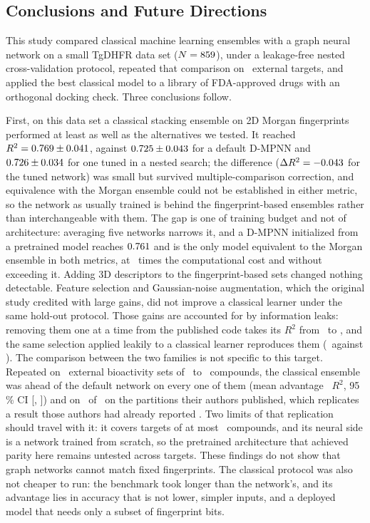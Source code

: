 \subsection{Conclusions and Future Directions}

This study compared classical machine learning ensembles with a graph neural network on a small TgDHFR data set ($N = 859$), under a leakage-free nested cross-validation protocol, repeated that comparison on \GenNTargets\ external targets, and applied the best classical model to a library of FDA-approved drugs with an orthogonal docking check. Three conclusions follow.

First, on this data set a classical stacking ensemble on 2D Morgan fingerprints performed at least as well as the alternatives we tested. It reached $R^2 = 0.769 \pm 0.041$, against $0.725 \pm 0.043$ for a default D-MPNN and $0.726 \pm 0.034$ for one tuned in a nested search; the difference ($\Delta R^2 = -0.043$ for the tuned network) was small but survived multiple-comparison correction, and equivalence with the Morgan ensemble could not be established in either metric, so the network as usually trained is behind the fingerprint-based ensembles rather than interchangeable with them. The gap is one of training budget and not of architecture: averaging five networks narrows it, and a D-MPNN initialized from a pretrained model reaches $0.761$ and is the only model equivalent to the Morgan ensemble in both metrics, at \ChemeleonCostFactor\ times the computational cost and without exceeding it. Adding 3D descriptors to the fingerprint-based sets changed nothing detectable. Feature selection and Gaussian-noise augmentation, which the original study credited with large gains, did not improve a classical learner under the same hold-out protocol. Those gains are accounted for by information leaks: removing them one at a time from the published code takes its $R^2$ from \KarLadderRungZeroRTwoMean\ to \KarLadderRungFourRTwoMean, and the same selection applied leakily to a classical learner reproduces them (\ExpBleakyRTwoMean\ against \ExpBRTwoMean). The comparison between the two families is not specific to this target. Repeated on \GenNTargets\ external bioactivity sets of \GenNMin\ to \GenNMax\ compounds, the classical ensemble was ahead of the default network on every one of them (mean advantage \GenCvAdvMean\ $R^2$, 95\,\% CI [\GenCvAdvCILow, \GenCvAdvCIHigh]) and on \GenHoldoutAdvNClassical\ of \GenNTargets\ on the partitions their authors published, which replicates a result those authors had already reported \citep{vantilborg2022}. Two limits of that replication should travel with it: it covers targets of at most \GenMaxCompounds\ compounds, and its neural side is a network trained from scratch, so the pretrained architecture that achieved parity here remains untested across targets. These findings do not show that graph networks cannot match fixed fingerprints. The classical protocol was also not cheaper to run: the benchmark took longer than the network's, and its advantage lies in accuracy that is not lower, simpler inputs, and a deployed model that needs only a subset of fingerprint bits.

